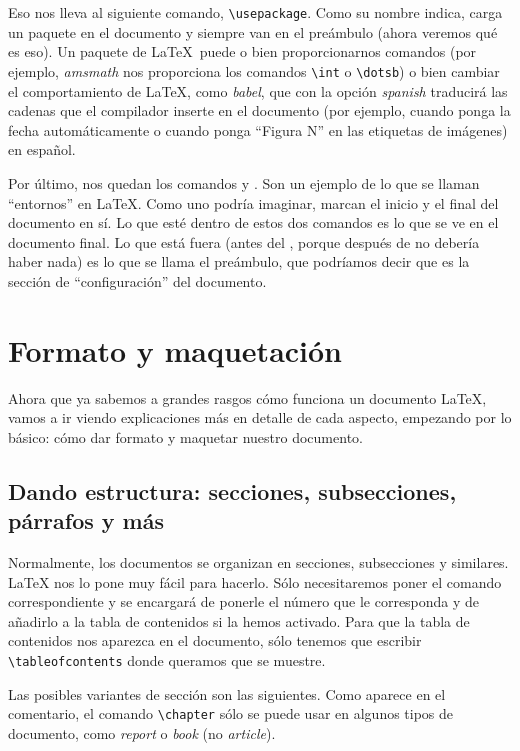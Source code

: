 Eso nos lleva al siguiente comando, \verb|\usepackage|. Como su nombre indica, carga un paquete en el documento y siempre van en el preámbulo (ahora veremos qué es eso). Un paquete de \LaTeX\ puede o bien proporcionarnos comandos (por ejemplo, \textit{amsmath} nos proporciona los comandos \verb|\int| o \verb|\dotsb|) o bien cambiar el comportamiento de \LaTeX, como \textit{babel}, que con la opción \textit{spanish} traducirá las cadenas que el compilador inserte en el documento (por ejemplo, cuando ponga la fecha automáticamente o cuando ponga ``Figura N'' en las etiquetas de imágenes) en español.

Por último, nos quedan los comandos \verb|| y \verb||. Son un ejemplo de lo que se llaman ``entornos'' en \LaTeX. Como uno podría imaginar, marcan el inicio y el final del documento en sí. Lo que esté dentro de estos dos comandos es lo que se ve en el documento final. Lo que está fuera (antes del \verb||, porque después de \verb|| no debería haber nada) es lo que se llama el preámbulo, que podríamos decir que es la sección de ``configuración'' del documento.

\section{Formato y maquetación}

Ahora que ya sabemos a grandes rasgos cómo funciona un documento \LaTeX, vamos a ir viendo explicaciones más en detalle de cada aspecto, empezando por lo básico: cómo dar formato y maquetar nuestro documento.

\subsection{Dando estructura: secciones, subsecciones, párrafos y más}

Normalmente, los documentos se organizan en secciones, subsecciones y similares. \LaTeX{} nos lo pone muy fácil para hacerlo. Sólo necesitaremos poner el comando correspondiente y se encargará de ponerle el número que le corresponda y de añadirlo a la tabla de contenidos si la hemos activado. Para que la tabla de contenidos nos aparezca en el documento, sólo tenemos que escribir \verb|\tableofcontents| donde queramos que se muestre.

Las posibles variantes de sección son las siguientes. Como aparece en el comentario, el comando \verb|\chapter| sólo se puede usar en algunos tipos de documento, como \textit{report} o \textit{book} (no \textit{article}).

